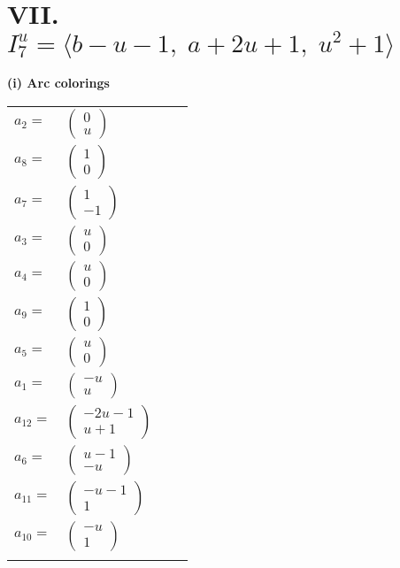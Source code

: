 \documentclass[1p]{elsarticle_modified}
\theoremstyle{definition}
\begin{document}
\centering \section*{VII. $I^u_{7}= \langle b- u-1,\;a+2 u+1,\;u^2+1 \rangle$}
\flushleft \textbf{(i) Arc colorings}\\
\begin{tabular}{m{7pt} m{180pt} m{7pt} m{180pt} }
\flushright $a_{2}=$&$\begin{pmatrix}0\\u\end{pmatrix}$ \\
\flushright $a_{8}=$&$\begin{pmatrix}1\\0\end{pmatrix}$ \\
\flushright $a_{7}=$&$\begin{pmatrix}1\\-1\end{pmatrix}$ \\
\flushright $a_{3}=$&$\begin{pmatrix}u\\0\end{pmatrix}$ \\
\flushright $a_{4}=$&$\begin{pmatrix}u\\0\end{pmatrix}$ \\
\flushright $a_{9}=$&$\begin{pmatrix}1\\0\end{pmatrix}$ \\
\flushright $a_{5}=$&$\begin{pmatrix}u\\0\end{pmatrix}$ \\
\flushright $a_{1}=$&$\begin{pmatrix}- u\\u\end{pmatrix}$ \\
\flushright $a_{12}=$&$\begin{pmatrix}-2 u-1\\u+1\end{pmatrix}$ \\
\flushright $a_{6}=$&$\begin{pmatrix}u-1\\- u\end{pmatrix}$ \\
\flushright $a_{11}=$&$\begin{pmatrix}- u-1\\1\end{pmatrix}$ \\
\flushright $a_{10}=$&$\begin{pmatrix}- u\\1\end{pmatrix}$\\&\end{tabular}
\end{document}
